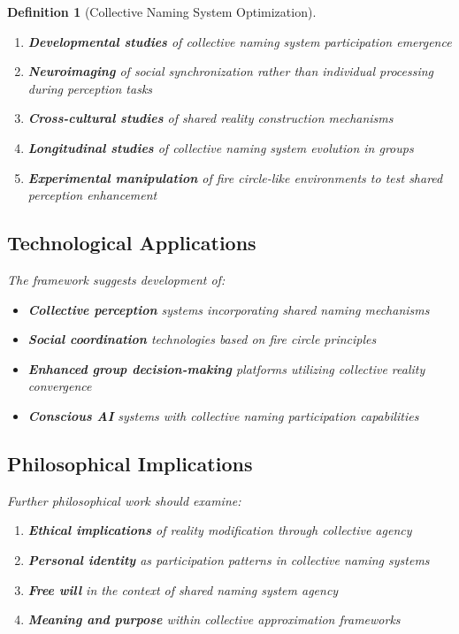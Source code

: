\documentclass[12pt]{article}
\newtheorem{definition}{Definition}
\begin{document}
\begin{definition}[Collective Naming System Optimization]
\begin{enumerate}
\item \textbf{Developmental studies} of collective naming system participation emergence
\item \textbf{Neuroimaging} of social synchronization rather than individual processing during perception tasks
\item \textbf{Cross-cultural studies} of shared reality construction mechanisms
\item \textbf{Longitudinal studies} of collective naming system evolution in groups
\item \textbf{Experimental manipulation} of fire circle-like environments to test shared perception enhancement
\end{enumerate}

\subsection{Technological Applications}

The framework suggests development of:

\begin{itemize}
\item \textbf{Collective perception} systems incorporating shared naming mechanisms
\item \textbf{Social coordination} technologies based on fire circle principles
\item \textbf{Enhanced group decision-making} platforms utilizing collective reality convergence
\item \textbf{Conscious AI} systems with collective naming participation capabilities
\end{itemize}

\subsection{Philosophical Implications}

Further philosophical work should examine:

\begin{enumerate}
\item \textbf{Ethical implications} of reality modification through collective agency
\item \textbf{Personal identity} as participation patterns in collective naming systems
\item \textbf{Free will} in the context of shared naming system agency
\item \textbf{Meaning and purpose} within collective approximation frameworks
\end{enumerate}


\end{definition}
\end{document}
